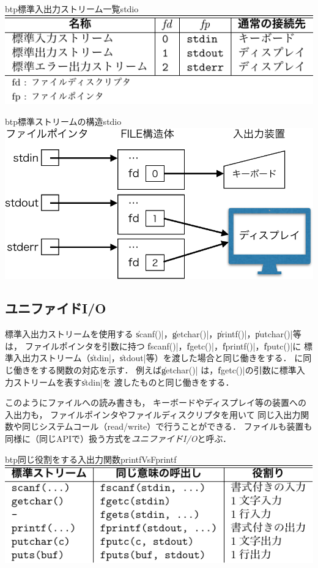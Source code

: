 \begin{mytable}{btp}{標準入出力ストリーム一覧}{stdio}
  \includegraphics[scale=1.0]{Tbl/stdio.pdf}
\end{mytable}

\begin{myfig}{btp}{標準ストリームの構造}{stdio}
\includegraphics[scale=0.7]{Fig/stdio-crop.pdf}
\end{myfig}

\subsection{ユニファイドI/O}
標準入出力ストリームを使用する
\|scanf()|，\|getchar()|，\|printf()|，\|putchar()|等は，
ファイルポインタを引数に持つ
\|fscanf()|，\|fgetc()|，\|fprintf()|，\|fputc()|に
標準入出力ストリーム（\|stdin|，\|stdout|等）を渡した場合と同じ働きをする．
に同じ働きをする関数の対応を示す．
例えば\|getchar()|%
は，\|fgetc()|の引数に標準入力ストリームを表す\|stdin|を
渡したものと同じ働きをする．

このようにファイルへの読み書きも，
キーボードやディスプレイ等の装置への入出力も，
ファイルポインタやファイルディスクリプタを用いて
同じ入出力関数や同じシステムコール（read/write）で行うことができる．
ファイルも装置も同様に（同じAPIで）扱う方式を{\em ユニファイドI/O}と呼ぶ．

\begin{mytable}{btp}{同じ役割をする入出力関数}{printfVsFprintf}
  \includegraphics[scale=1.0]{Tbl/printfVsFprintf.pdf}
\end{mytable}

